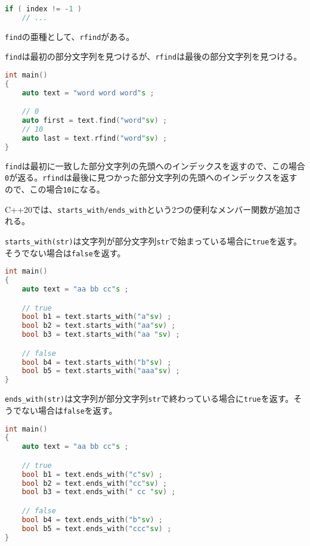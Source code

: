 \begin{lstlisting}[language={C++}]
if ( index != -1 )
    // ...
\end{lstlisting}

\texttt{find}の亜種として、\texttt{rfind}がある。

\texttt{find}は最初の部分文字列を見つけるが、\texttt{rfind}は最後の部分文字列を見つける。

\begin{lstlisting}[language={C++}]
int main()
{
    auto text = "word word word"s ;

    // 0
    auto first = text.find("word"sv) ;
    // 10
    auto last = text.rfind("word"sv) ;
}
\end{lstlisting}

\texttt{find}は最初に一致した部分文字列の先頭へのインデックスを返すので、この場合\texttt{0}が返る。\texttt{rfind}は最後に見つかった部分文字列の先頭へのインデックスを返すので、この場合\texttt{10}になる。

C++20では、\texttt{starts\_with/ends\_with}という2つの便利なメンバー関数が追加される。

\texttt{starts\_with(str)}は文字列が部分文字列\texttt{str}で始まっている場合に\texttt{true}を返す。そうでない場合は\texttt{false}を返す。

\ifTombow\pagebreak\fi
\begin{lstlisting}[language={C++}]
int main()
{
    auto text = "aa bb cc"s ;

    // true
    bool b1 = text.starts_with("a"sv) ;
    bool b2 = text.starts_with("aa"sv) ;
    bool b3 = text.starts_with("aa "sv) ;

    // false
    bool b4 = text.starts_with("b"sv) ;
    bool b5 = text.starts_with("aaa"sv) ;
}
\end{lstlisting}

\texttt{ends\_with(str)}は文字列が部分文字列\texttt{str}で終わっている場合に\texttt{true}を返す。そうでない場合は\texttt{false}を返す。

\begin{lstlisting}[language={C++}]
int main()
{
    auto text = "aa bb cc"s ;

    // true
    bool b1 = text.ends_with("c"sv) ;
    bool b2 = text.ends_with("cc"sv) ;
    bool b3 = text.ends_with(" cc "sv) ;

    // false
    bool b4 = text.ends_with("b"sv) ;
    bool b5 = text.ends_with("ccc"sv) ;
}
\end{lstlisting}


